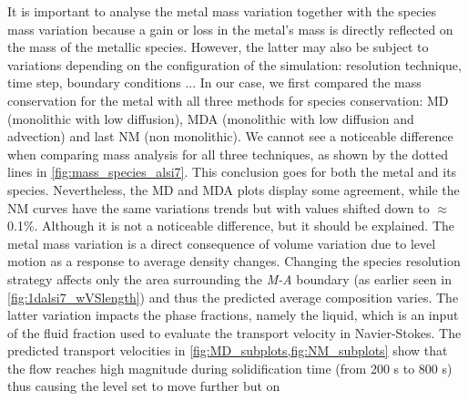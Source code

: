 It is important to analyse the metal mass variation together with the species mass variation
because a gain or loss in the metal's mass is directly reflected on the mass of the metallic species.
However, the latter may also be subject to variations depending on the configuration of the simulation:
resolution technique, time step, boundary conditions ...
In our case, we first compared the mass conservation for the metal with all three methods for species conservation:
MD (monolithic with low diffusion), MDA (monolithic with low diffusion and advection) and last NM (non monolithic).
We cannot see a noticeable difference when comparing mass analysis for all three techniques, as shown by the dotted lines in \cref{fig:mass_species_alsi7}.
This conclusion goes for both the metal and its species. Nevertheless, the MD and MDA plots display some agreement, 
while the NM curves have the same variations trends but with values shifted down to $\approx$ 0.1\%.
Although it is not a noticeable difference, but it should be explained.
The metal mass variation is a direct consequence of volume variation due to level motion as a response to average density changes.
Changing the species resolution strategy affects only the area surrounding the \emph{M-A} boundary (as earlier seen in 
\cref{fig:1dalsi7_wVSlength}) and thus the predicted average composition varies. The latter variation impacts the phase fractions,
namely the liquid, which is an input of the fluid fraction used to evaluate the transport velocity in Navier-Stokes.
The predicted transport velocities in \cref{fig:MD_subplots,fig:NM_subplots} show that the flow reaches high
magnitude during solidification time (from 200 s to 800 s) thus causing the level set to move further but on  

